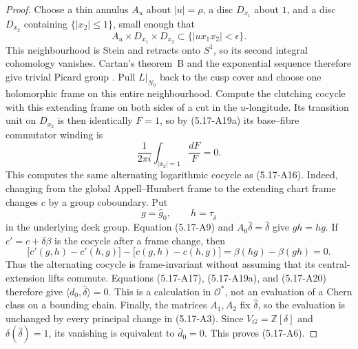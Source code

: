 \begin{proof}
Choose a thin annulus \(A_u\) about \(|u|=\rho\), a disc \(D_{x_1}\)
about \(1\), and a disc \(D_{x_2}\) containing \(\{|x_2|\le1\}\), small
enough that
\[
 A_u\times D_{x_1}\times D_{x_2}
 \subset\{|ux_1x_2|<\epsilon\}.
\tag{5.17-A19c}
\]
This neighbourhood is Stein and retracts onto \(S^1\), so its second
integral cohomology vanishes.  Cartan's theorem~B and the exponential
sequence therefore give trivial Picard group
\cite[\S2, fundamental theorem, p.~81]{Cartan1957}%
\cite[Proposition~6.28 and equations~(6.35)--(6.36),
pp.~180--182]{Lee2024}.  Pull \(L|_{N_0}\) back to
the cusp cover and choose one holomorphic frame on this entire
neighbourhood.  Compute the clutching cocycle with this extending frame on
both sides of a cut in the \(u\)-longitude.  Its transition unit on
\(D_{x_2}\) is then identically \(F=1\), so by (5.17-A19a) its
base--fibre commutator winding is
\[
 \frac1{2\pi i}\int_{|x_2|=1}\frac{dF}{F}=0.
\tag{5.17-A20}
\]
This computes the same alternating logarithmic cocycle as (5.17-A16).
Indeed, changing from the global Appell--Humbert frame to the extending
chart frame changes \(c\) by a group coboundary.  Put
\[
 g=\widehat g_0,
 \qquad
 h=\tau_{\widehat\delta}
\]
in the underlying deck group.  Equation (5.17-A9) and
\(A_0\widehat\delta=\widehat\delta\) give \(gh=hg\).  If
\(c'=c+\delta\beta\) is the cocycle after a frame change, then
\[
 \bigl[c'(g,h)-c'(h,g)\bigr]
 -\bigl[c(g,h)-c(h,g)\bigr]
 =\beta(hg)-\beta(gh)=0.
\]
Thus the alternating cocycle is frame-invariant without assuming that its
central-extension lifts commute.  Equations (5.17-A17), (5.17-A19a), and
(5.17-A20) therefore give
\(\langle d_0,\widehat\delta\rangle=0\).  This is a calculation in
\(\mathcal O^*\), not an evaluation of a Chern class on a bounding chain.
Finally, the matrices \(A_1,A_2\) fix
\(\widehat\delta\), so the evaluation is unchanged by every principal
change in (5.17-A3).  Since
\(V_G=\mathbb Z[\delta]\) and
\(\delta(\widehat\delta)=1\), its vanishing is equivalent to
\(\bar d_0=0\).  This proves (5.17-A6).
\end{proof}

